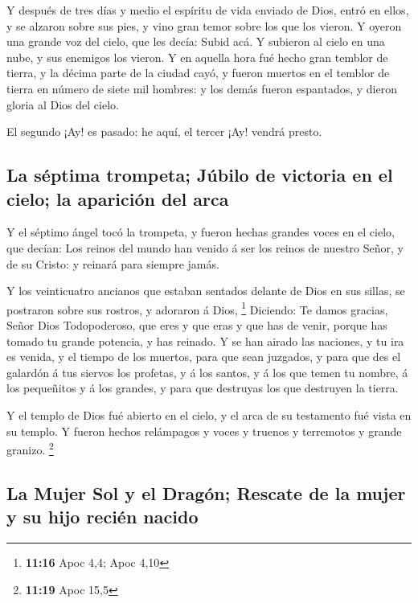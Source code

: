  Y después de tres días y medio el espíritu de vida
enviado de Dios, entró en ellos, y se alzaron sobre sus pies, y vino
gran temor sobre los que los vieron.  Y oyeron una grande
voz del cielo, que les decía: Subid acá. Y subieron al cielo en una
nube, y sus enemigos los vieron.  Y en aquella hora fué
hecho gran temblor de tierra, y la décima parte de la ciudad cayó, y
fueron muertos en el temblor de tierra en número de siete mil hombres: y
los demás fueron espantados, y dieron gloria al Dios del cielo.

 El segundo ¡Ay! es pasado: he aquí, el tercer ¡Ay!
vendrá presto.

\hypertarget{la-suxe9ptima-trompeta-juxfabilo-de-victoria-en-el-cielo-la-apariciuxf3n-del-arca}{%
\subsection{La séptima trompeta; Júbilo de victoria en el cielo; la
aparición del
arca}\label{la-suxe9ptima-trompeta-juxfabilo-de-victoria-en-el-cielo-la-apariciuxf3n-del-arca}}

 Y el séptimo ángel tocó la trompeta, y fueron hechas
grandes voces en el cielo, que decían: Los reinos del mundo han venido á
ser los reinos de nuestro Señor, y de su Cristo: y reinará para siempre
jamás.

 Y los veinticuatro ancianos que estaban sentados delante
de Dios en sus sillas, se postraron sobre sus rostros, y adoraron á
Dios, \footnote{\textbf{11:16} Apoc 4,4; Apoc 4,10} 
Diciendo: Te damos gracias, Señor Dios Todopoderoso, que eres y que eras
y que has de venir, porque has tomado tu grande potencia, y has reinado.
 Y se han airado las naciones, y tu ira es venida, y el
tiempo de los muertos, para que sean juzgados, y para que des el
galardón á tus siervos los profetas, y á los santos, y á los que temen
tu nombre, á los pequeñitos y á los grandes, y para que destruyas los
que destruyen la tierra.

 Y el templo de Dios fué abierto en el cielo, y el arca
de su testamento fué vista en su templo. Y fueron hechos relámpagos y
voces y truenos y terremotos y grande granizo. \footnote{\textbf{11:19}
  Apoc 15,5}

\hypertarget{la-mujer-sol-y-el-draguxf3n-rescate-de-la-mujer-y-su-hijo-reciuxe9n-nacido}{%
\subsection{La Mujer Sol y el Dragón; Rescate de la mujer y su hijo
recién
nacido}\label{la-mujer-sol-y-el-draguxf3n-rescate-de-la-mujer-y-su-hijo-reciuxe9n-nacido}}

